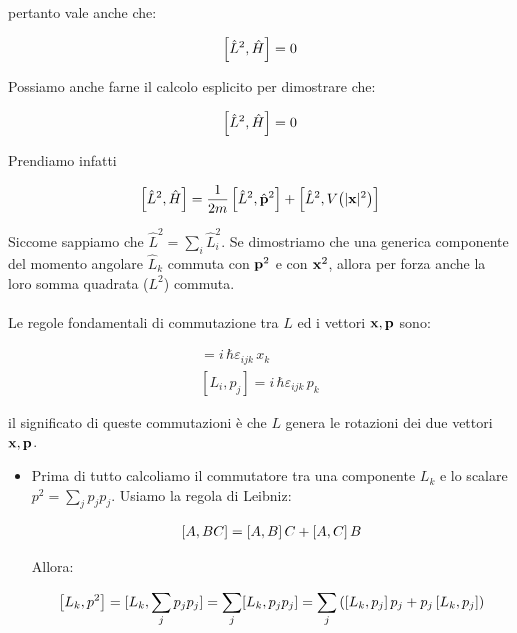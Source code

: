 	pertanto vale anche che:

\begin{align*}
	\qty[\hat{L}^2, \hat{H}] = 0
\end{align*}	

\begin{myapprf}
	Possiamo anche farne il calcolo esplicito per dimostrare che:
		
	\begin{align*}
		\qty[\hat{L}^2, \hat{H}] = 0
	\end{align*}
		
	Prendiamo infatti 

	\begin{align*}
		\qty[\hat{L}^2, \hat{H}] = \frac{1}{2m} \, \qty[ \hat{L}^2, \hat{\vb{p}}^2] + \qty[\hat{L}^2, V\qty(|\vb{x}|^2)] 
	\end{align*}
	
	Siccome sappiamo che $\hat{L}^2 = \sum_i \hat{L}_i^2$.
Se dimostriamo che una generica componente del momento angolare $\hat{L}_k$ commuta con $\vb{p}^2$ e con $\vb{x}^2$, allora per forza anche la loro somma quadrata ($L^2$) commuta.
	\\
	\\
	Le regole fondamentali di commutazione tra $L$ ed i vettori $\vb{x}, \vb{p}$ sono:
	
\begin{align*}
	[L_i, x_j] = i \, \hbar \varepsilon_{ijk} \, x_k
	\\
	[L_i, p_j] = i \, \hbar \varepsilon_{ijk} \, p_k
\end{align*}
	
	il significato di queste commutazioni è che $L$ genera le rotazioni dei due vettori $\vb{x}, \vb{p}$.

\begin{itemize}
	\item Prima di tutto calcoliamo il commutatore tra una componente $L_k$ e lo scalare $p^2 = \sum_j p_j p_j$. Usiamo la regola di Leibniz: 
	
	\begin{align*}
		\qty[A, BC] = \qty[A, B] \, C + \qty[A, C] \, B
	\end{align*}
	
		Allora:
	
	\begin{align*}
		\qty[L_k, p^2] = [L_k, \sum_j p_j p_j] = \sum_j [L_k, p_j p_j] =  \sum_j \qty( [L_k, p_j] \, p_j + p_j \, [L_k, p_j] )
	\end{align*}
	

\end{itemize}
\end{myapprf}
